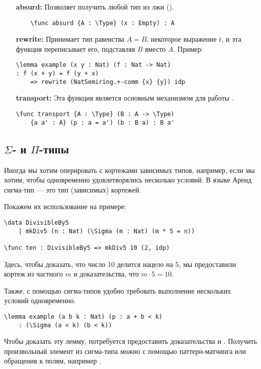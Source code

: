 \begin{itemize}
\item [\bf absurd:] Позволяет получить любой тип из лжи ().
\begin{verbatim}
    \func absurd {A : \Type} (x : Empty) : A
\end{verbatim}

\item [\bf rewrite:] Принимает тип равенства $A = B$, некоторое выражение $t$, и эта функция переписывает его, подставляя $B$ вместо $A$.
Пример:
\begin{verbatim}
\lemma example (x y : Nat) (f : Nat -> Nat)
: f (x + y) = f (y + x)
    => rewrite (NatSemiring.+-comm {x} {y}) idp
\end{verbatim}

\item [\bf transport:] Эта функция является основным механизмом для работы .
\begin{verbatim}
\func transport {A : \Type} (B : A -> \Type)
    {a a' : A} (p : a = a') (b : B a) : B a'
\end{verbatim}
\end{itemize}

\subsection{$\Sigma$- и $\Pi$-типы}
Иногда мы хотим оперировать с кортежами зависимых типов, например, если мы хотим,
чтобы одновременно удовлетворялись несколько условий. В языке Аренд сигма-тип --- это тип (зависимых) кортежей.

Покажем их использование на примере:
\begin{verbatim}
\data DivisibleBy5
    | mkDiv5 (n : Nat) (\Sigma (m : Nat) (m * 5 = n))

\func ten : DivisibleBy5 => mkDiv5 10 (2, idp)
\end{verbatim}

Здесь, чтобы доказать, что число 10 делится нацело на 5, мы предоставили кортеж из частного $m$ и доказательства, что $m \cdot 5 = 10$.

Также, с помощью сигма-типов удобно требовать выполнение нескольких условий одновременно.
\begin{verbatim}
\lemma example (a b k : Nat) (p : a + b < k)
    : (\Sigma (a < k) (b < k))
\end{verbatim}

Чтобы доказать эту лемму, потребуется предоставить доказательства  и .
Получить произвольный элемент из сигма-типа можно с помощью паттерн-матчинга или обращения к полям, например .

